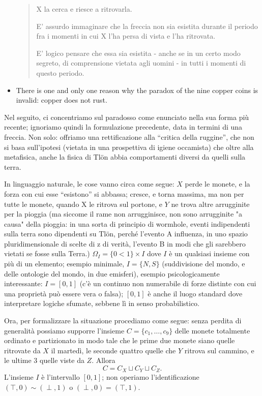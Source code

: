 \begin{example}
\begin{itemize}
\begin{quote}
    X la cerca e riesce a ritrovarla.
    
    E' assurdo immaginare che la freccia non sia esistita durante il periodo fra i momenti in cui X l'ha persa di vista e l'ha ritrovata.
    
    E' logico pensare che essa sia esistita - anche se in un certo modo segreto, di comprensione vietata agli uomini - in tutti i momenti di questo periodo.
\end{quote}
    \item There is one and only one reason why the paradox of the nine copper coins is invalid: copper does not rust.
  \end{itemize}
  Nel seguito, ci concentriamo sul paradosso come enunciato nella sua forma più recente; ignoriamo quindi la formulazione precedente, data in termini di una freccia. Non solo: offriamo una rettificazione alla ``critica della ruggine'', che non si basa sull'ipotesi (vietata in una prospettiva di igiene occamista) che oltre alla metafisica, anche la fisica di Tl\"on abbia comportamenti diversi da quelli sulla terra.

  In linguaggio naturale, le cose vanno circa come segue: $X$ perde le monete, e la forza con cui esse ``esistono'' si abbassa; cresce, e torna massima, ma non per tutte le monete, quando X le ritrova sul portone,  e $Y$ ne trova altre arrugginite per la pioggia (ma siccome il rame non arrugginisce, non sono arrugginite "a causa" della pioggia: in una sorta di principio di wormhole, eventi indipendenti sulla terra sono dipendenti su Tlön, perché l'evento A influenza, in uno spazio pluridimensionale di scelte di z di verità, l'evento B in modi che gli sarebbero vietati se fosse sulla Terra.) $\Omega_I = \{0<1\}\times I$ dove $I$ è un qualsiasi insieme con più di un elemento; esempio minimale, $I=\{N,S\}$ (suddivisione del mondo, e delle ontologie del mondo, in due emisferi), esempio psicologicamente interessante: $I=[0,1]$ (c'è un continuo non numerabile di forze distinte con cui una proprietà può essere vera o falsa); $[0,1]$ è anche il luogo standard dove interpretare logiche sfumate, sebbene lì in senso probabilistico.

  Ora, per formalizzare la situazione procediamo come segue: senza perdita di generalità possiamo supporre l'insieme $C = \{c_1,\dots,c_9\}$ delle monete totalmente ordinato e partizionato in modo tale che le prime due monete siano quelle ritrovate da $X$ il martedì, le seconde quattro quelle che $Y$ ritrova sul cammino, e le ultime 3 quelle viste da $Z$. Allora
  \[C = C_X \sqcup C_Y \sqcup C_Z.\]
  L'insieme $I$ è l'intervallo $[0,1]$; non operiamo l'identificazione $(\top,0) \sim (\perp,1)$ o $(\perp,0) = (\top,1)$.


\end{example}
